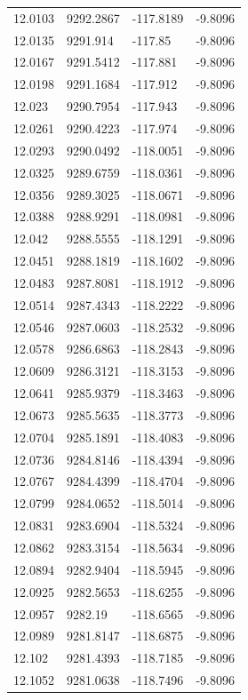 \begin{table}[H]
\begin{tabular}{llll}
12.0103 & 9292.2867 & -117.8189 & -9.8096 \\
12.0135 & 9291.914 & -117.85 & -9.8096 \\
12.0167 & 9291.5412 & -117.881 & -9.8096 \\
12.0198 & 9291.1684 & -117.912 & -9.8096 \\
12.023 & 9290.7954 & -117.943 & -9.8096 \\
12.0261 & 9290.4223 & -117.974 & -9.8096 \\
12.0293 & 9290.0492 & -118.0051 & -9.8096 \\
12.0325 & 9289.6759 & -118.0361 & -9.8096 \\
12.0356 & 9289.3025 & -118.0671 & -9.8096 \\
12.0388 & 9288.9291 & -118.0981 & -9.8096 \\
12.042 & 9288.5555 & -118.1291 & -9.8096 \\
12.0451 & 9288.1819 & -118.1602 & -9.8096 \\
12.0483 & 9287.8081 & -118.1912 & -9.8096 \\
12.0514 & 9287.4343 & -118.2222 & -9.8096 \\
12.0546 & 9287.0603 & -118.2532 & -9.8096 \\
12.0578 & 9286.6863 & -118.2843 & -9.8096 \\
12.0609 & 9286.3121 & -118.3153 & -9.8096 \\
12.0641 & 9285.9379 & -118.3463 & -9.8096 \\
12.0673 & 9285.5635 & -118.3773 & -9.8096 \\
12.0704 & 9285.1891 & -118.4083 & -9.8096 \\
12.0736 & 9284.8146 & -118.4394 & -9.8096 \\
12.0767 & 9284.4399 & -118.4704 & -9.8096 \\
12.0799 & 9284.0652 & -118.5014 & -9.8096 \\
12.0831 & 9283.6904 & -118.5324 & -9.8096 \\
12.0862 & 9283.3154 & -118.5634 & -9.8096 \\
12.0894 & 9282.9404 & -118.5945 & -9.8096 \\
12.0925 & 9282.5653 & -118.6255 & -9.8096 \\
12.0957 & 9282.19 & -118.6565 & -9.8096 \\
12.0989 & 9281.8147 & -118.6875 & -9.8096 \\
12.102 & 9281.4393 & -118.7185 & -9.8096 \\
12.1052 & 9281.0638 & -118.7496 & -9.8096 \\

\end{tabular}
\end{table}
